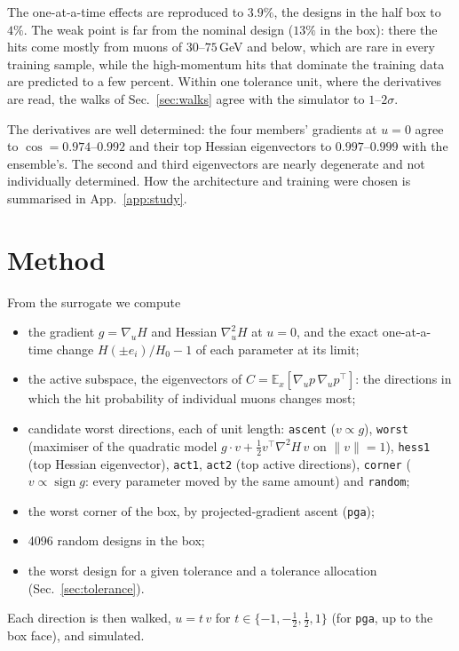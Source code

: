 \documentclass[11pt,a4paper]{article}
\begin{document}
The one-at-a-time effects are reproduced to $3.9\%$, the designs in the half box to $4\%$. The
weak point is far from the nominal design ($13\%$ in the box):
there the hits come mostly from muons of $30$--$75$\,GeV and below, which are rare in every
training sample, while the high-momentum hits that dominate the training data are predicted to a
few percent. Within one tolerance unit, where the derivatives are read, the walks of
Sec.~\ref{sec:walks} agree with the simulator to $1$--$2\sigma$.

The derivatives are well determined: the four members' gradients at $u=0$ agree to
$\cos=0.974$--$0.992$ and their top Hessian eigenvectors to $0.997$--$0.999$ with the
ensemble's. The second and third eigenvectors are nearly
degenerate and not individually determined. How the architecture and training were chosen is
summarised in App.~\ref{app:study}.

\section{Method}

From the surrogate we compute
\begin{itemize}
  \item the gradient $g=\nabla_u H$ and Hessian $\nabla^2_u H$ at $u=0$, and the exact
        one-at-a-time change $H(\pm e_i)/H_0-1$ of each parameter at its limit;
  \item the active subspace, the eigenvectors of $C=\mathbb{E}_x[\nabla_u p\,\nabla_u p^\top]$:
        the directions in which the hit probability of individual muons changes most;
  \item candidate worst directions, each of unit length:
    \texttt{ascent} ($v\propto g$),
    \texttt{worst} (maximiser of the quadratic model $g\cdot v+\tfrac12 v^\top\nabla^2H\,v$ on
    $\|v\|=1$),
    \texttt{hess1} (top Hessian eigenvector), \texttt{act1}, \texttt{act2} (top active
    directions), \texttt{corner} ($v\propto\operatorname{sign} g$: every parameter moved by the
    same amount) and \texttt{random};
  \item the worst corner of the box, by projected-gradient ascent (\texttt{pga});
  \item 4096 random designs in the box;
  \item the worst design for a given tolerance and a tolerance allocation
        (Sec.~\ref{sec:tolerance}).
\end{itemize}
Each direction is then walked, $u=t\,v$ for $t\in\{-1,-\tfrac12,\tfrac12,1\}$ (for \texttt{pga},
up to the box face), and simulated.
\end{document}
